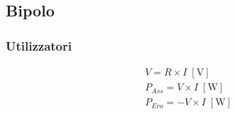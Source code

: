 \documentclass[10pt]{article}
\begin{document}
    \subsection*{Bipolo}

        \begin{minipage}[t]{.3\textwidth}
            \vspace{-\baselineskip}

            \subsubsection*{Utilizzatori}

                \begin{minipage}[t]{.2\textwidth}
                    \vspace{-\baselineskip}

                    
                \end{minipage}
                \hfill
                \begin{minipage}[t]{.8\textwidth}
                    \vspace{-1.5\baselineskip}

                    \begin{align*}
                        &V = R \times I \; [\mathrm{V}]\\
                        &P_{Ass} = V \times I \; [\mathrm{W}]\\
                        &P_{Ero} = - V \times I \; [\mathrm{W}]
                    \end{align*}
                \end{minipage}

        \end{minipage}
        \hfill
\end{document}
